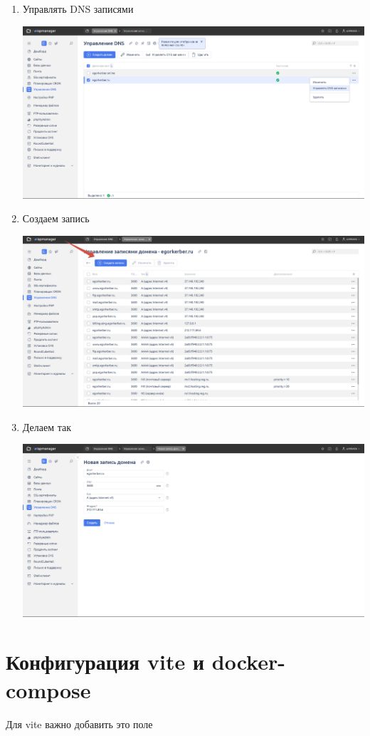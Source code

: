 \documentclass[14pt, a4paper]{extarticle}
\begin{document}
\begin{enumerate}
    \item Управлять DNS записями 
    
    \includegraphics*[width=0.8\linewidth]{img/2024-02-17-20-09-03.png}

    \item Создаем запись
    
    \includegraphics*[width=0.8\linewidth]{img/2024-02-17-20-09-44.png}

    \item Делаем так

    \includegraphics*[width=0.8\linewidth]{img/2024-02-17-20-10-30.png}
\end{enumerate}

\newpage
\section{Конфигурация vite и docker-compose}

Для vite важно добавить это поле 
\end{document}
